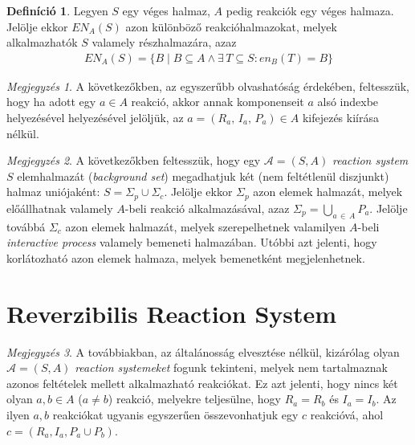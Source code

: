 \documentclass[12pt]{article}
\theoremstyle{definition}
\newtheorem*{definition*}{Definíció}
\theoremstyle{remark}
\newtheorem*{remark*}{Megjegyzés}
\theoremstyle{plain}
\theoremstyle{plain}
\newcommand{\en}{\textit{en}}
\newcommand{\reaction}[3]{
    (#1, \, #2, \, #3)
}
\begin{document}
    \begin{definition*}
        Legyen $S$ egy véges halmaz, $A$ pedig reakciók egy véges halmaza. Jelölje ekkor $\textit{EN}_{A}(S)$ azon különböző reakcióhalmazokat, melyek alkalmazhatók $S$ valamely részhalmazára, azaz
        \begin{align*}
            \textit{EN}_{A}(S) = \{ B \;|\; B \subseteq A \wedge \exists\,T \subseteq S : \en_{B}(T) = B \}
        \end{align*}
    \end{definition*}
    
    \begin{remark*}
        A következőkben, az egyszerűbb olvashatóság érdekében, feltesszük, hogy ha adott egy $a \in A$ reakció, akkor annak komponenseit $a$ alsó indexbe helyezésével helyezésével jelöljük, az $a = \reaction{R_{a}}{I_{a}}{P_{a}} \in A$ kifejezés kiírása nélkül.
    \end{remark*}

    \begin{remark*}
        A következőkben feltesszük, hogy egy $\mathscr{A} = (S, A)$ \textit{reaction system} $S$ elemhalmazát (\textit{background set}) megadhatjuk két (nem feltétlenül diszjunkt) halmaz uniójaként: $S = \Sigma_{p} \cup \Sigma_{c}$. Jelölje ekkor $\Sigma_{p}$ azon elemek halmazát, melyek előállhatnak valamely $A$-beli reakció alkalmazásával, azaz $\Sigma_{p} = \bigcup_{a \, \in \, A}P_{a}$. Jelölje továbbá $\Sigma_{c}$ azon elemek halmazát, melyek szerepelhetnek valamilyen $A$-beli \textit{interactive process} valamely bemeneti halmazában. Utóbbi azt jelenti, hogy korlátozható azon elemek halmaza, melyek bemenetként megjelenhetnek.
    \end{remark*}

    \section*{Reverzibilis Reaction System}

    \begin{remark*}
        A továbbiakban, az általánosság elvesztése nélkül, kizárólag olyan $\mathscr{A} = (S, A)$ \textit{reaction systemeket} fogunk tekinteni, melyek nem tartalmaznak azonos feltételek mellett alkalmazható reakciókat. Ez azt jelenti, hogy nincs két olyan $a, b\in A$ ($a \neq b$) reakció, melyekre teljesülne, hogy $R_{a} = R_{b}$ és $I_{a} = I_{b}$. Az ilyen $a, b$ reakciókat ugyanis egyszerűen összevonhatjuk egy $c$ reakcióvá, ahol $c = (R_{a}, I_{a}, P_{a} \cup P_{b})$.
    \end{remark*}
\end{document}
